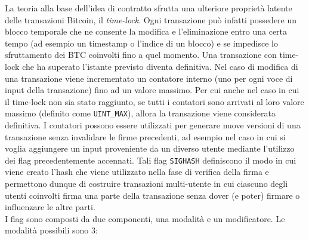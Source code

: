 La teoria alla base dell'idea di contratto sfrutta una ulteriore proprietà latente delle transazioni Bitcoin, il \emph{time-lock}. Ogni transazione può infatti possedere un blocco temporale che ne consente la modifica e l'eliminazione entro una certa tempo (ad esempio un timestamp o l'indice di un blocco) e se impedisce lo sfruttamento dei BTC coinvolti fino a quel momento. Una transazione con time-lock che ha superato l'istante previsto diventa definitiva.
Nel caso di modifica di una transazione viene incrementato un contatore interno (uno per ogni voce di input della transazione) fino ad un valore massimo. Per cui anche nel caso in cui il time-lock non sia stato raggiunto, se tutti i contatori sono arrivati al loro valore massimo (definito come \verb|UINT_MAX|), allora la transazione viene considerata definitiva. I contatori possono essere utilizzati per generare nuove versioni di una transazione senza invalidare le firme precedenti, ad esempio nel caso in cui si voglia aggiungere un input proveniente da un diverso utente mediante l'utilizzo dei flag precedentemente accennati. Tali flag \verb|SIGHASH| definiscono il modo in cui viene creato l'hash che viene utilizzato nella fase di verifica della firma e permettono dunque di costruire transazioni multi-utente in cui ciascuno degli utenti coinvolti firma una parte della transazione senza dover (e poter) firmare o influenzare le altre parti.\\
I flag sono composti da due componenti, una modalità e un modificatore. Le modalità possibili sono 3:
